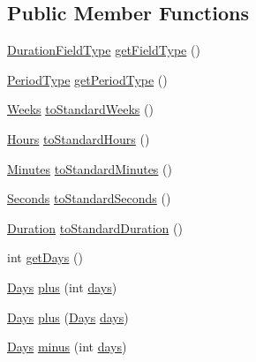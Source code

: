 \subsection*{Public Member Functions}
\begin{DoxyCompactItemize}
\item 
\hyperlink{classorg_1_1joda_1_1time_1_1_duration_field_type}{Duration\-Field\-Type} \hyperlink{classorg_1_1joda_1_1time_1_1_days_af5cd99035f7053c2ea13d7adfa909247}{get\-Field\-Type} ()
\item 
\hyperlink{classorg_1_1joda_1_1time_1_1_period_type}{Period\-Type} \hyperlink{classorg_1_1joda_1_1time_1_1_days_a7fac3ac667ee3d8bb1c523d205218c28}{get\-Period\-Type} ()
\item 
\hyperlink{classorg_1_1joda_1_1time_1_1_weeks}{Weeks} \hyperlink{classorg_1_1joda_1_1time_1_1_days_ac6dcd839baa071367dc9cb05ea5b2b3c}{to\-Standard\-Weeks} ()
\item 
\hyperlink{classorg_1_1joda_1_1time_1_1_hours}{Hours} \hyperlink{classorg_1_1joda_1_1time_1_1_days_ae432dfad7d48db18bc42be07f43d9301}{to\-Standard\-Hours} ()
\item 
\hyperlink{classorg_1_1joda_1_1time_1_1_minutes}{Minutes} \hyperlink{classorg_1_1joda_1_1time_1_1_days_adbe582083750e1cc29c9dd1de0fabf68}{to\-Standard\-Minutes} ()
\item 
\hyperlink{classorg_1_1joda_1_1time_1_1_seconds}{Seconds} \hyperlink{classorg_1_1joda_1_1time_1_1_days_a0ba3812bc0fafebea37ce236f689f6ab}{to\-Standard\-Seconds} ()
\item 
\hyperlink{classorg_1_1joda_1_1time_1_1_duration}{Duration} \hyperlink{classorg_1_1joda_1_1time_1_1_days_a553fd47018a0b8ce00f6654aa266e148}{to\-Standard\-Duration} ()
\item 
int \hyperlink{classorg_1_1joda_1_1time_1_1_days_ae2683a1e71cecad4325140688f2467f4}{get\-Days} ()
\item 
\hyperlink{classorg_1_1joda_1_1time_1_1_days}{Days} \hyperlink{classorg_1_1joda_1_1time_1_1_days_aa24beb648af30ec98a02a7165a56acec}{plus} (int \hyperlink{classorg_1_1joda_1_1time_1_1_days_a1e3870b240bd5cb9461d87e8c753eb60}{days})
\item 
\hyperlink{classorg_1_1joda_1_1time_1_1_days}{Days} \hyperlink{classorg_1_1joda_1_1time_1_1_days_ad99a9c08b610bb33726f3aa44ac32066}{plus} (\hyperlink{classorg_1_1joda_1_1time_1_1_days}{Days} \hyperlink{classorg_1_1joda_1_1time_1_1_days_a1e3870b240bd5cb9461d87e8c753eb60}{days})
\item 
\hyperlink{classorg_1_1joda_1_1time_1_1_days}{Days} \hyperlink{classorg_1_1joda_1_1time_1_1_days_ae746c6520ac3eff1dfb3865bfdb6b85d}{minus} (int \hyperlink{classorg_1_1joda_1_1time_1_1_days_a1e3870b240bd5cb9461d87e8c753eb60}{days})

\end{DoxyCompactItemize}
